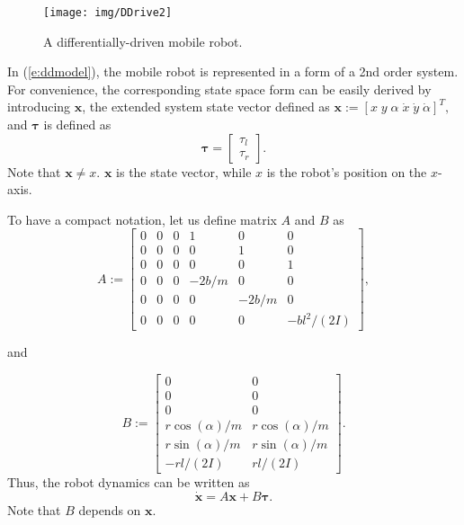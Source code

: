     \begin{figure}[h]
        \centering
        \texttt{[image: img/DDrive2]}
        \caption{A differentially-driven mobile robot.}
        \label{fig:ddrive}
    \end{figure}

    In (\ref{e:ddmodel}), the mobile robot is represented in a form of  a 2nd order system.
For convenience, the corresponding state space form can be easily derived by introducing
    $\mathbf{x}$, the extended system state vector   defined as
$ \mathbf{x} := [x \; y \; \alpha \; \dot x \; \dot y \; \dot\alpha]^T,$
and $\mathbf{\tau}$ is defined as
$$\mathbf{\tau}=
\begin{bmatrix}
    \tau_l \\
    \tau_r
\end{bmatrix}.  $$
Note that $\mathbf{x} \neq x$. $\mathbf{x}$ is the state vector, while $x$ is the robot's position on the $x$-axis.


To have a compact notation, let us define matrix $A$ and $B$ as
$$A :=
    \begin{bmatrix}
0 & 0 & 0 & 1 & 0 & 0 \\
0 & 0 & 0 & 0 & 1 & 0 \\
0 & 0 & 0 & 0 & 0 & 1 \\
0 & 0 & 0 & -2b/m & 0 & 0 \\
0 & 0 & 0 & 0 & -2b/m & 0 \\
0 & 0 & 0 & 0 & 0 & -bl^2/(2I)
    \end{bmatrix} ,$$

and

$$B:=
\begin{bmatrix}
    0 & 0 \\
    0 &     0 \\
    0 & 0 \\
r\cos(\alpha)/m &   r\cos(\alpha)/m \\
r\sin(\alpha)/m &   r\sin(\alpha)/m \\
-rl/(2I)    &   rl/(2I)
\end{bmatrix}.  $$
Thus, the robot dynamics can be written as
\begin{equation}\label{e:dy1}
\mathbf{\dot x}=A \mathbf{x} + B \mathbf{\tau}.
\end{equation}
Note that $B$ depends on $\mathbf{x}$.


